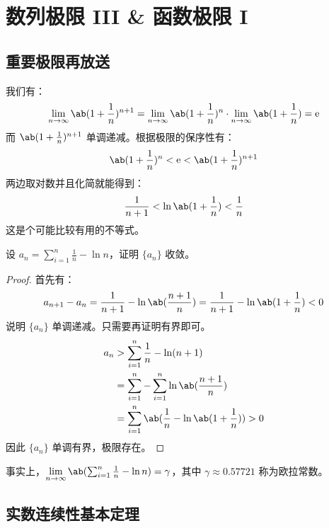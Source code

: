 \section{数列极限 III \& 函数极限 I}

\subsection{重要极限再放送}

我们有：
$$
\lim_{n \to \infty} \ab(1 + \frac{1}{n})^{n + 1} = \lim_{n \to \infty} \ab(1 + \frac{1}{n})^n \cdot \lim_{n \to \infty} \ab(1 + \frac{1}{n}) = \E
$$
而 $\ab(1 + \frac{1}{n})^{n + 1}$ 单调递减。根据极限的保序性有：
$$
\ab(1 + \frac{1}{n})^n < \E < \ab(1 + \frac{1}{n})^{n + 1}
$$
两边取对数并且化简就能得到：
$$
\frac{1}{n + 1} < \ln\ab(1 + \frac{1}{n}) < \frac{1}{n}
$$
这是个可能比较有用的不等式。

\begin{example}
	设 $a_n = \sum_{i=1}^n \frac{1}{n} - \ln n$，证明 $\{a_n\}$ 收敛。

	\begin{proof}
		首先有：
		$$
		a_{n+1} - a_n = \frac{1}{n + 1} - \ln\ab(\frac{n + 1}{n}) = \frac{1}{n + 1} - \ln\ab(1 + \frac{1}{n}) < 0
		$$
		说明 $\{a_n\}$ 单调递减。只需要再证明有界即可。
		$$
		\begin{aligned}
			a_n & > \sum_{i=1}^n \frac{1}{n} - \ln(n+1) \\
			& = \sum_{i=1}^n - \sum_{i=1}^n \ln\ab(\frac{n + 1}{n}) \\
			& = \sum_{i=1}^n \ab(\frac{1}{n} - \ln\ab(1 + \frac{1}{n})) > 0
		\end{aligned}
		$$
		因此 $\{a_n\}$ 单调有界，极限存在。
	\end{proof}
\end{example}

事实上，$\lim\limits_{n \to \infty} \ab(\sum_{i=1}^n \frac{1}{n} - \ln n) = \gamma$，其中 $\gamma \approx 0.57721$ 称为欧拉常数。

\subsection{实数连续性基本定理}

